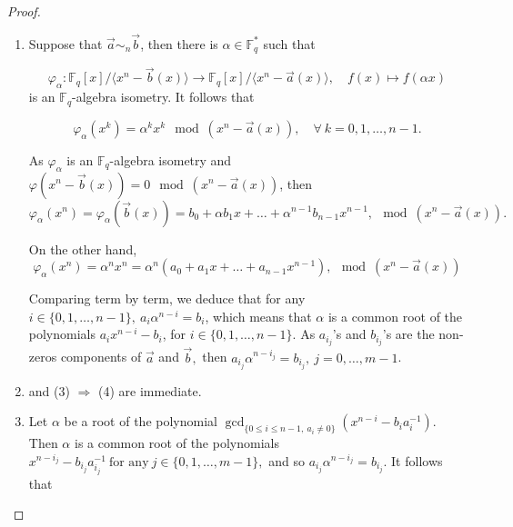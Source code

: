 \documentclass[10pt,a4paper]{amsart}
\begin{document}
\begin{proof}
\begin{enumerate}
    \item [(1) $\Rightarrow$ (2)] 
    Suppose that $ \vec{a} \sim_{n} \vec{b} $, then there is $\alpha \in \mathbb{F}_q^*$ such that

$$\varphi_{\alpha} : \mathbb{F}_q[x] /\langle x^n - \vec{b}(x) \rangle \to \mathbb{F}_q[x] /\langle x^n - \vec{a}(x) \rangle, \quad f(x) \mapsto f(\alpha x) $$
is an $\mathbb{F}_q$-algebra isometry.  It follows that

$$ 
\varphi_{\alpha}(x^k) =  \alpha^k x^{k} \mod (x^n - \vec{a}(x)), \quad \forall  \ k = 0, 1, \ldots, n-1.
$$

As $\varphi_{\alpha}$ is an $\mathbb{F}_q$-algebra isometry and $ \varphi(x^n - \vec{b}(x)) = 0 \mod (x^n - \vec{a}(x))$, then
\begin{equation}
\varphi_{\alpha}(x^n) = \varphi_{\alpha}(\vec{b}(x)) = b_0 + \alpha b_1 x + \ldots + \alpha^{n-1}b_{n-1} x^{n-1}, \mod (x^n - \vec{a}(x)).
\end{equation}

On the other hand,
\begin{equation}
\varphi_{\alpha}(x^n) = \alpha^n x^n = \alpha^n ( a_0 + a_1 x + \ldots + a_{n-1} x^{n-1}), \mod (x^n - \vec{a}(x))
\end{equation}

Comparing term by term, we deduce that for any $ i \in \{0, 1, \ldots, n-1\}, \ a_i \alpha^{n-i} = b_i$, which means that $\alpha$ is a common root of the polynomials $ a_i x^{n-i} - b_i $, for $ i \in \{0, 1, \ldots, n-1\}$. As  $ a_{i_j}$'s and $  b_{i_j}$'s are the non-zeros components of $\vec{a}$ and $\vec{b},$   then $ a_{i_j} \alpha^{n-{i_j}} = b_{i_j},\ j=0,\ldots,m-1$.

\item[(2) $\Rightarrow$ (3)] and  (3) $\Rightarrow$ (4) are immediate. 

 \item [(4) $\Rightarrow$ (5)]
    Let $\alpha $ be a root of the polynomial   $\gcd_{\{0 \leq i \leq n-1, \ a_i \neq 0\}}( x^{n-i} - b_i a_i^{-1}) $. Then $\alpha$ is a common root of the polynomials $  x^{n-i_j} - b_{i_j} a_{i_j}^{-1} \  \text{for any} \ j\in \{ 0,1,\ldots, m-1\},$ and so   $a_{i_j} \alpha^{n-i_j}= b_{i_j}$.
    It follows that 


\end{enumerate}
\end{proof}
\end{document}
